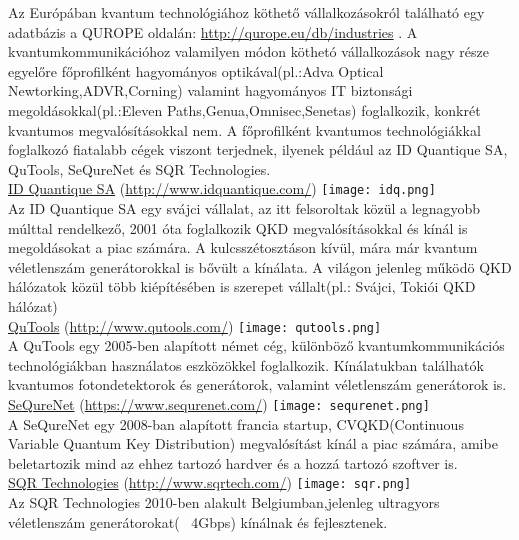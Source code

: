 Az Európában kvantum technológiához köthető vállalkozásokról található egy adatbázis a QUROPE oldalán: \url{http://qurope.eu/db/industries} . A kvantumkommunikációhoz valamilyen módon köthetó vállalkozások nagy része egyelőre főprofilként hagyományos optikával(pl.:Adva Optical Newtorking,ADVR,Corning) valamint hagyományos IT biztonsági megoldásokkal(pl.:Eleven Paths,Genua,Omnisec,Senetas) foglalkozik, konkrét kvantumos megvalósításokkal nem. A főprofilként kvantumos technológiákkal foglalkozó fiatalabb cégek viszont terjednek, ilyenek például az ID Quantique SA, QuTools, SeQureNet és SQR Technologies.\\
\underline{ID Quantique SA}  (\url{http://www.idquantique.com/}) \texttt{[image: idq.png]}\\
Az ID Quantique SA egy svájci vállalat, az itt felsoroltak közül a legnagyobb múlttal rendelkező, 2001 óta foglalkozik QKD megvalósításokkal és kínál is megoldásokat a piac számára. A kulcsszétosztáson kívül, mára már kvantum véletlenszám generátorokkal is bővült a kínálata. A világon jelenleg működö QKD hálózatok közül több kiépítésében is szerepet vállalt(pl.: Svájci, Tokiói QKD hálózat)\\
\underline{QuTools} (\url{http://www.qutools.com/}) \texttt{[image: qutools.png]}\\
A QuTools egy 2005-ben alapított német cég, különböző kvantumkommunikációs technológiákban használatos eszközökkel foglalkozik. Kínálatukban találhatók kvantumos fotondetektorok és generátorok, valamint véletlenszám generátorok is.\\
\underline{SeQureNet} (\url{https://www.sequrenet.com/}) \texttt{[image: sequrenet.png]}\\
A SeQureNet egy 2008-ban alapított francia startup, CVQKD(Continuous Variable Quantum Key Distribution) megvalósítást kínál a piac számára, amibe beletartozik mind az ehhez tartozó hardver és a hozzá tartozó szoftver is.\\
\underline{SQR Technologies} (\url{http://www.sqrtech.com/}) \texttt{[image: sqr.png]}\\
Az SQR Technologies 2010-ben alakult Belgiumban,jelenleg ultragyors véletlenszám generátorokat( ~4Gbps) kínálnak és fejlesztenek.\\

